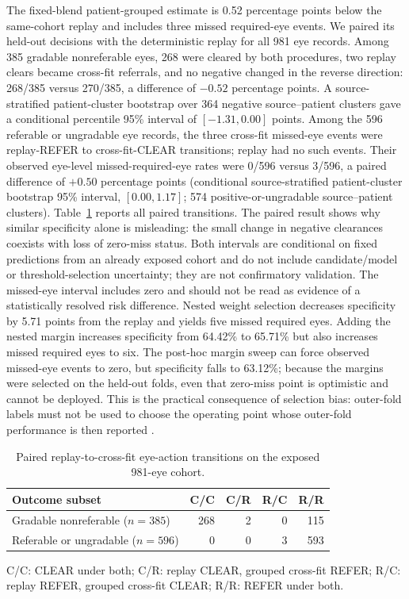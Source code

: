 \documentclass[11pt]{article}
\begin{document}
The fixed-blend patient-grouped estimate is 0.52 percentage points below the same-cohort replay and includes three missed required-eye events. We paired its held-out decisions with the deterministic replay for all 981 eye records. Among 385 gradable nonreferable eyes, 268 were cleared by both procedures, two replay clears became cross-fit referrals, and no negative changed in the reverse direction: 268/385 versus 270/385, a difference of $-0.52$ percentage points. A source-stratified patient-cluster bootstrap over 364 negative source--patient clusters gave a conditional percentile 95\% interval of $[-1.31,0.00]$ points. Among the 596 referable or ungradable eye records, the three cross-fit missed-eye events were replay-REFER to cross-fit-CLEAR transitions; replay had no such events. Their observed eye-level missed-required-eye rates were 0/596 versus 3/596, a paired difference of $+0.50$ percentage points (conditional source-stratified patient-cluster bootstrap 95\% interval, $[0.00,1.17]$; 574 positive-or-ungradable source--patient clusters). Table~\ref{tab:paired-transitions} reports all paired transitions. The paired result shows why similar specificity alone is misleading: the small change in negative clearances coexists with loss of zero-miss status. Both intervals are conditional on fixed predictions from an already exposed cohort and do not include candidate/model or threshold-selection uncertainty; they are not confirmatory validation. The missed-eye interval includes zero and should not be read as evidence of a statistically resolved risk difference. Nested weight selection decreases specificity by 5.71 points from the replay and yields five missed required eyes. Adding the nested margin increases specificity from 64.42\% to 65.71\% but also increases missed required eyes to six. The post-hoc margin sweep can force observed missed-eye events to zero, but specificity falls to 63.12\%; because the margins were selected on the held-out folds, even that zero-miss point is optimistic and cannot be deployed. This is the practical consequence of selection bias: outer-fold labels must not be used to choose the operating point whose outer-fold performance is then reported \cite{cawley2010,varma2006}.

\begin{table}[t]
\centering
\caption{Paired replay-to-cross-fit eye-action transitions on the exposed 981-eye cohort.}
\label{tab:paired-transitions}
\begin{tabular}{lrrrr}
\toprule
Outcome subset & C/C & C/R & R/C & R/R \\
\midrule
Gradable nonreferable ($n=385$) & 268 & 2 & 0 & 115 \\
Referable or ungradable ($n=596$) & 0 & 0 & 3 & 593 \\
\bottomrule
\end{tabular}
\smallskip
\parbox{0.9\linewidth}{\footnotesize C/C: CLEAR under both; C/R: replay CLEAR, grouped cross-fit REFER; R/C: replay REFER, grouped cross-fit CLEAR; R/R: REFER under both.}
\end{table}
\end{document}
